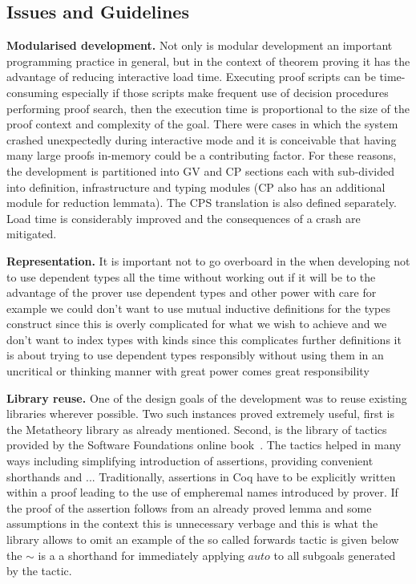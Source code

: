 \subsection{Issues and Guidelines}

\textbf{Modularised development.} Not only is modular development an important
programming practice in general, but in the context of theorem proving it has
the advantage of reducing interactive load time. Executing proof scripts can
be time-consuming especially if those scripts make frequent use of decision
procedures performing proof search, then the execution time is proportional to
the size of the proof context and complexity of the goal. There were cases in
which the system crashed unexpectedly during interactive mode and it is
conceivable that having many large proofs in-memory could be a contributing
factor. For these reasons, the development is partitioned into GV and CP
sections each with sub-divided into definition, infrastructure and typing
modules (CP also has an additional module for reduction lemmata). The CPS
translation is also defined separately. Load time is considerably improved and
the consequences of a crash are mitigated.

\textbf{Representation.} It is important not to go overboard in the
when developing not to use dependent types all the time without working out if
it will be to the advantage of the prover use dependent types and other power
with care for example we could don't want to use mutual inductive definitions
for the types construct since this is overly complicated for what we wish to
achieve and we don't want to index types with kinds since this complicates
further definitions it is about trying to use dependent types responsibly
without using them in an uncritical or thinking manner with great power comes
great responsibility

\textbf{Library reuse.} One of the design goals of the development was to
reuse existing libraries wherever possible. Two such instances proved
extremely useful, first is the Metatheory library as already
mentioned. Second, is the library of tactics provided by the Software
Foundations online book~\cite{SF}.  The tactics helped in many ways including
simplifying introduction of assertions, providing convenient shorthands and
... Traditionally, assertions in Coq have to be explicitly written within a
proof leading to the use of empheremal names introduced by prover. If the
proof of the assertion follows from an already proved lemma and some
assumptions in the context this is unnecessary verbage and this is what the
library allows to omit  an example
of the so called forwards tactic is given below the $\sim$ is a a shorthand
for immediately applying \coqe$auto$ to all subgoals generated by the tactic.

